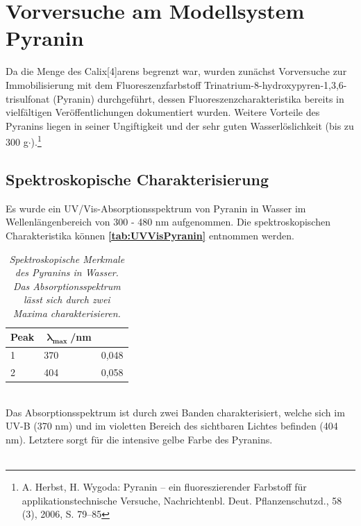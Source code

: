 \documentclass[12pt,a4paper]{report}
\begin{document}
	\section{Vorversuche am Modellsystem Pyranin}
	Da die Menge des Calix[4]arens begrenzt war, wurden zunächst Vorversuche zur Immobilisierung mit dem Fluoreszenzfarbstoff Trinatrium-8-hydroxypyren-1,3,6-trisulfonat (Pyranin) durchgeführt, dessen Fluoreszenzcharakteristika bereits in vielfältigen Veröffentlichungen dokumentiert wurden. Weitere Vorteile des Pyranins liegen in seiner Ungiftigkeit und der sehr guten Wasserlöslichkeit (bis zu 300 g$\cdot$).\footnote{A. Herbst, H. Wygoda: Pyranin – ein fluoreszierender Farbstoff für
		applikationstechnische Versuche, Nachrichtenbl. Deut. Pflanzenschutzd., 58 (3), 2006, S. 79–85}
	\subsection{Spektroskopische Charakterisierung}
	Es wurde ein UV/Vis-Absorptionsspektrum von Pyranin in Wasser im Wellenlängenbereich von 300 - 480 nm aufgenommen. Die spektroskopischen Charakteristika können \textbf{\autoref{tab:UVVisPyranin}} entnommen werden. 
	\begin{table}[h!]
		\centering
		\caption{\textnormal{\textit{Spektroskopische Merkmale des Pyranins in Wasser. Das Absorptionsspektrum lässt sich durch zwei Maxima charakterisieren.}}}
		\label{tab:UVVisPyranin}
		\begin{tabular}{p{2.5cm}p{2.5cm}l}
			\toprule
			Peak&$\mathbf{\uplambda_{max}}$/nm &\ce{A_{max}} \\ 
			\hline
			1&370&0,048\\
			2&404&0,058\\
			\bottomrule
		\end{tabular}
	\end{table}\\
	Das Absorptionsspektrum ist durch zwei Banden charakterisiert, welche sich im UV-B (370 nm) und im violetten Bereich des sichtbaren Lichtes befinden (404 nm). Letztere sorgt für die intensive gelbe Farbe des Pyranins.\\
	\ \\
\end{document}
